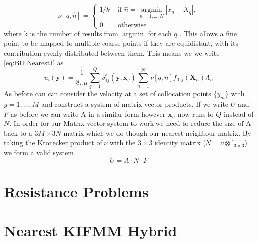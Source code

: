 \begin{equation*}
    \nu [q, \hat{n}]= \begin{cases} 1/k & \text { if } \hat{n}=\underset{n=1, \ldots, N}{\operatorname{argmin}}|x_n-X_q| , \\ 0 & \text { otherwise }\end{cases}
\end{equation*}
where k is the number of results from $\operatorname{argmin}$ for each $q$ \cite{Gallagher2020}. This allows a fine point to be mapped to multiple coarse points if they are equidistant, with its contribution evenly distributed between them. This means we we write \cref{eq:BIENearest1} as 
\begin{equation}
    u_i(\mathbf{y}) = \frac{1}{8 \pi \mu} \sum_{q=1}^Q S_{i j}^{\epsilon}\left(\mathbf{y}, \mathbf{x}_q\right) \sum_{n=1}^{N} \nu[q,n] f_{0,j}(\mathbf{X}_n) A_n
\end{equation}
As before can can consider the velocity at a set of collocation points $\{y_m\}$ with $y=1,\dots,M$ and construct a system of matrix vector products. If we write $U$ and $F$ as before we can write A in a similar form however $\mathbf{x}_n$ now runs to $Q$ instead of $N$. In order for our Matrix vector system to work we need to reduce the size of A back to a $3M \times 3N$ matrix which we do though our nearest neighbour matrix. By taking the Kronecker product of $\nu$ with the $3 \times 3$ identity matrix ($N = \nu \otimes \mathbb{I}_{3\times3}$) we form a valid system
\begin{equation}
    U = A \cdot N \cdot F
\end{equation}

\section{Resistance Problems}

\section{Nearest KIFMM Hybrid}
